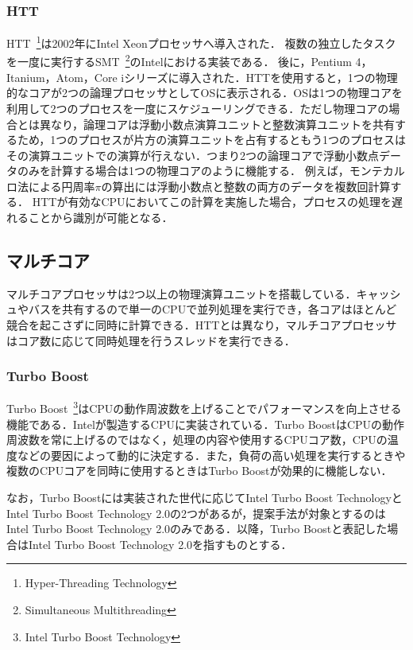 \subsubsection{HTT}
HTT~\footnote{Hyper-Threading Technology}は2002年にIntel Xeonプロセッサへ導入された．
複数の独立したタスクを一度に実行するSMT~\footnote{Simultaneous Multithreading}のIntelにおける実装である．
後に，Pentium 4，Itanium，Atom，Core iシリーズに導入された．HTTを使用すると，1つの物理的なコアが2つの論理プロセッサとしてOSに表示される．OSは1つの物理コアを利用して2つのプロセスを一度にスケジューリングできる．ただし物理コアの場合とは異なり，論理コアは浮動小数点演算ユニットと整数演算ユニットを共有するため，1つのプロセスが片方の演算ユニットを占有するともう1つのプロセスはその演算ユニットでの演算が行えない．つまり2つの論理コアで浮動小数点データのみを計算する場合は1つの物理コアのように機能する．
例えば，モンテカルロ法による円周率$\pi$の算出には浮動小数点と整数の両方のデータを複数回計算する．
HTTが有効なCPUにおいてこの計算を実施した場合，プロセスの処理を遅れることから識別が可能となる．
\subsection{マルチコア}
マルチコアプロセッサは2つ以上の物理演算ユニットを搭載している．キャッシュやバスを共有するので単一のCPUで並列処理を実行でき，各コアはほとんど競合を起こさずに同時に計算できる．HTTとは異なり，マルチコアプロセッサはコア数に応じて同時処理を行うスレッドを実行できる．
\subsubsection{Turbo Boost}
Turbo Boost~\footnote{Intel Turbo Boost Technology}はCPUの動作周波数を上げることでパフォーマンスを向上させる機能である．Intelが製造するCPUに実装されている．Turbo BoostはCPUの動作周波数を常に上げるのではなく，処理の内容や使用するCPUコア数，CPUの温度などの要因によって動的に決定する．また，負荷の高い処理を実行するときや複数のCPUコアを同時に使用するときはTurbo Boostが効果的に機能しない．

なお，Turbo Boostには実装された世代に応じてIntel Turbo Boost TechnologyとIntel Turbo Boost Technology 2.0の2つがあるが，提案手法が対象とするのはIntel Turbo Boost Technology 2.0のみである．以降，Turbo Boostと表記した場合はIntel Turbo Boost Technology 2.0を指すものとする．
